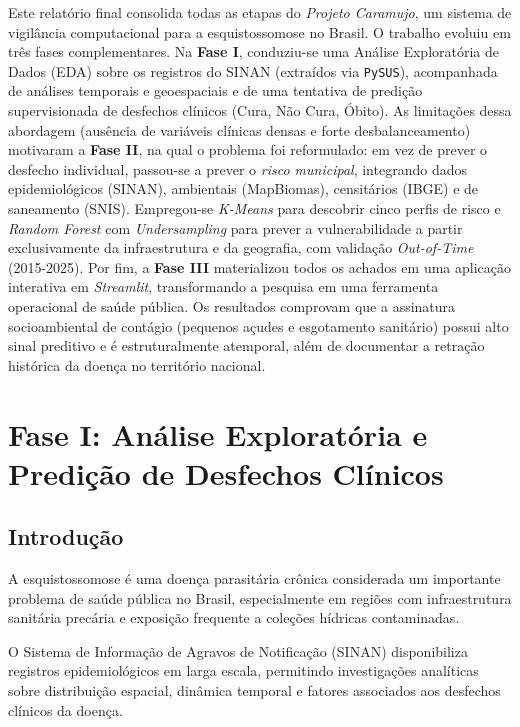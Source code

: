 \documentclass[12pt]{article}
\begin{document}
\begin{resumo}
Este relatório final consolida todas as etapas do \textit{Projeto Caramujo}, um
sistema de vigilância computacional para a esquistossomose no Brasil. O trabalho
evoluiu em três fases complementares. Na \textbf{Fase I}, conduziu-se uma Análise
Exploratória de Dados (EDA) sobre os registros do SINAN (extraídos via
\texttt{PySUS}), acompanhada de análises temporais e geoespaciais e de uma tentativa
de predição supervisionada de desfechos clínicos (Cura, Não Cura, Óbito). As
limitações dessa abordagem (ausência de variáveis clínicas densas e forte
desbalanceamento) motivaram a \textbf{Fase II}, na qual o problema foi reformulado:
em vez de prever o desfecho individual, passou-se a prever o \emph{risco municipal},
integrando dados epidemiológicos (SINAN), ambientais (MapBiomas), censitários (IBGE)
e de saneamento (SNIS). Empregou-se \textit{K-Means} para descobrir cinco perfis de
risco e \textit{Random Forest} com \textit{Undersampling} para prever a
vulnerabilidade a partir exclusivamente da infraestrutura e da geografia, com
validação \textit{Out-of-Time} (2015-2025). Por fim, a \textbf{Fase III} materializou
todos os achados em uma aplicação interativa em \textit{Streamlit}, transformando a
pesquisa em uma ferramenta operacional de saúde pública. Os resultados comprovam que
a assinatura socioambiental de contágio (pequenos açudes e esgotamento sanitário)
possui alto sinal preditivo e é estruturalmente atemporal, além de documentar a
retração histórica da doença no território nacional.
\end{resumo}

\section{Fase I: Análise Exploratória e Predição de Desfechos Clínicos}

\subsection{Introdução}

A esquistossomose é uma doença parasitária crônica considerada um importante problema
de saúde pública no Brasil, especialmente em regiões com infraestrutura sanitária
precária e exposição frequente a coleções hídricas contaminadas.

O Sistema de Informação de Agravos de Notificação (SINAN) disponibiliza registros
epidemiológicos em larga escala, permitindo investigações analíticas sobre
distribuição espacial, dinâmica temporal e fatores associados aos desfechos clínicos
da doença.
\end{document}
